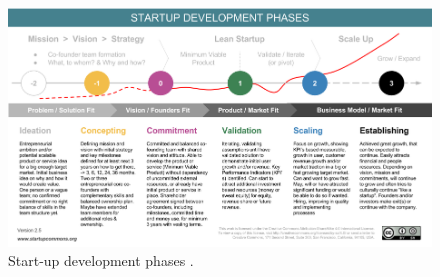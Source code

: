 \documentclass[twoside]{report}
\begin{document}
\begin{figure}
\begin{center}
\includegraphics[width=\linewidth]{development_phases.png}
\caption{Start-up development phases \cite{startup_commons_startup_2015}.}
\label{fig:framework}
\end{center}
\end{figure}
\end{document}
